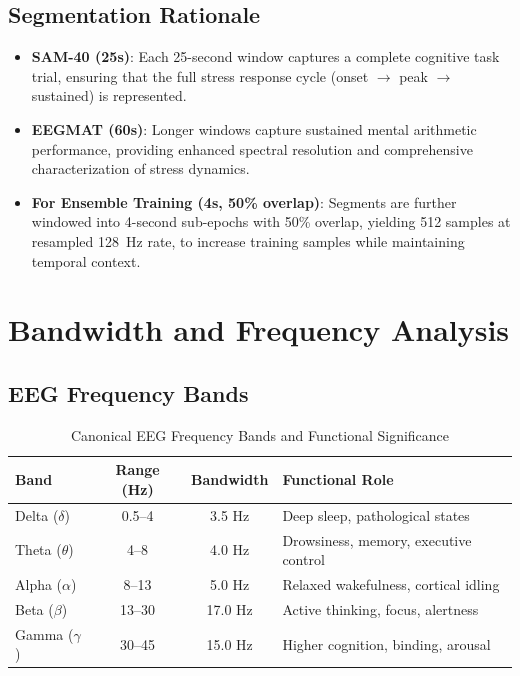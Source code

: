 \documentclass[11pt,a4paper]{article}
\begin{document}
\subsection{Segmentation Rationale}

\begin{itemize}[leftmargin=*]
\item \textbf{SAM-40 (25s)}: Each 25-second window captures a complete cognitive task trial, ensuring that the full stress response cycle (onset $\to$ peak $\to$ sustained) is represented.
\item \textbf{EEGMAT (60s)}: Longer windows capture sustained mental arithmetic performance, providing enhanced spectral resolution and comprehensive characterization of stress dynamics.
\item \textbf{For Ensemble Training (4s, 50\% overlap)}: Segments are further windowed into 4-second sub-epochs with 50\% overlap, yielding 512 samples at resampled 128~Hz rate, to increase training samples while maintaining temporal context.
\end{itemize}

\section{Bandwidth and Frequency Analysis}

\subsection{EEG Frequency Bands}

\begin{table}[H]
\centering
\caption{Canonical EEG Frequency Bands and Functional Significance}
\small
\begin{tabular}{lccl}
\toprule
\textbf{Band} & \textbf{Range (Hz)} & \textbf{Bandwidth} & \textbf{Functional Role} \\
\midrule
Delta ($\delta$) & 0.5--4 & 3.5 Hz & Deep sleep, pathological states \\
Theta ($\theta$) & 4--8 & 4.0 Hz & Drowsiness, memory, executive control \\
Alpha ($\alpha$) & 8--13 & 5.0 Hz & Relaxed wakefulness, cortical idling \\
Beta ($\beta$) & 13--30 & 17.0 Hz & Active thinking, focus, alertness \\
Gamma ($\gamma$) & 30--45 & 15.0 Hz & Higher cognition, binding, arousal \\
\bottomrule
\end{tabular}
\end{table}
\end{document}
